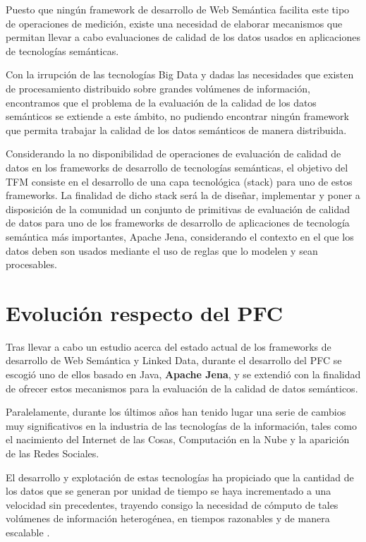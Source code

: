 Puesto que ningún framework de desarrollo de Web Semántica facilita este tipo de
operaciones de medición, existe una necesidad de elaborar
mecanismos que permitan llevar a cabo evaluaciones de calidad de los datos
usados en aplicaciones de tecnologías semánticas.


Con la irrupción de las tecnologías Big Data y dadas las necesidades que existen
de procesamiento distribuido sobre grandes volúmenes de información, encontramos
que el problema de la evaluación de la calidad de los datos semánticos se
extiende a este ámbito, no pudiendo encontrar ningún framework que permita
trabajar la calidad de los datos semánticos de manera distribuida. 

Considerando la no disponibilidad de operaciones de evaluación de calidad de datos en los
frameworks de desarrollo de tecnologías semánticas, el objetivo del \acf{TFM}
consiste en el desarrollo de una capa tecnológica (stack) para uno de estos frameworks. La finalidad de
dicho stack será la de diseñar, implementar y poner a disposición de la
comunidad un conjunto de primitivas de evaluación de calidad de datos para uno de
los frameworks de desarrollo de aplicaciones de tecnología semántica más
importantes, Apache Jena, considerando el contexto en el que los
datos deben son usados mediante el uso de reglas que lo modelen y sean procesables.


\section{Evolución respecto del PFC}


Tras llevar a cabo un estudio acerca del estado actual de los frameworks de
desarrollo de Web Semántica y Linked Data, durante el desarrollo del \acf{PFC}
se escogió uno de ellos basado en
Java, \textbf{Apache Jena}, y se extendió con la finalidad de ofrecer estos
mecanismos para la evaluación de la calidad de datos semánticos.

Paralelamente, durante los últimos años han tenido lugar una serie de cambios muy
significativos
en la industria de las tecnologías de la información, tales como el nacimiento
del Internet
de las Cosas, Computación en la Nube y la aparición de las Redes Sociales.


El desarrollo y explotación de estas tecnologías ha propiciado que la cantidad
de los datos
que se generan por unidad de tiempo se haya incrementado a una velocidad sin
precedentes,
trayendo consigo la necesidad de cómputo de tales volúmenes de información
heterogénea,
en tiempos razonables y de manera escalable \cite{map_reduce}.

